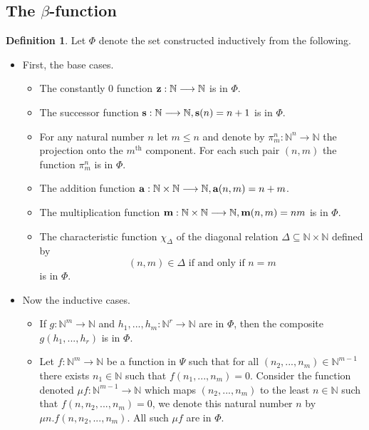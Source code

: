 \documentclass[12pt]{article}
\theoremstyle{plain}
\theoremstyle{definition}
\newtheorem{defn}[thm]{Definition} %
\newcommand{\bb}[1]{\mathbb{#1}}
\newcommand{\lto}{\longrightarrow}
\begin{document}
	\subsection{The $\beta$-function}
	\begin{defn}\label{def:prim_rec_reduct}
		Let $\Phi$ denote the set constructed inductively from the following.
		\begin{itemize}
			\item First, the base cases.
			\begin{itemize}
				\item The constantly $0$ function $\bold{z}: \bb{N} \lto \bb{N}$ is in $\Phi$.
				\item The successor function $\bold{s}: \bb{N} \lto \bb{N}, \bold{s}(n) = n+1$ is in $\Phi$.
				\item For any natural number $n$ let $m \leq n$ and denote by $\pi_m^n: \bb{N}^n \lto \bb{N}$ the projection onto the $m^\text{th}$ component. For each such pair $(n,m)$ the function $\pi^n_m$ is in $\Phi$.
				\item The addition function $\bold{a}: \bb{N} \times \bb{N} \lto \bb{N}, \bold{a}(n,m) = n+m$.
				\item The multiplication function $\bold{m}: \bb{N} \times \bb{N} \lto \bb{N}, \bold{m}(n,m) = nm$ is in $\Phi$.
				\item The characteristic function $\chi_\Delta$ of the diagonal relation $\Delta\subseteq \bb{N} \times \bb{N}$ defined by
				\begin{equation}
					(n,m) \in \Delta\text{ if and only if } n = m
				\end{equation}
				is in $\Phi$.
			\end{itemize}
			\item Now the inductive cases.
			\begin{itemize}
				\item If $g: \bb{N}^m \lto \bb{N}$ and $h_1,...,h_m: \bb{N}^r \lto \bb{N}$ are in $\Phi$, then the composite $g(h_1,...,h_r)$ is in $\Phi$.
				\item Let $f: \bb{N}^m \lto \bb{N}$ be a function in $\Psi$ such that for all $(n_2,...,n_m) \in \bb{N}^{m-1}$ there exists $n_1 \in \bb{N}$ such that $f(n_1,...,n_m) = 0$. Consider the function denoted $\mu f: \bb{N}^{m-1} \lto \bb{N}$ which maps $(n_2,...,n_m)$ to the least $n \in \bb{N}$ such that $f(n,n_2,...,n_m) = 0$, we denote this natural number $n$ by $\mu n. f(n,n_2,...,n_m)$. All such $\mu f$ are in $\Phi$.
			\end{itemize}
		\end{itemize}
	\end{defn}
\end{document}
